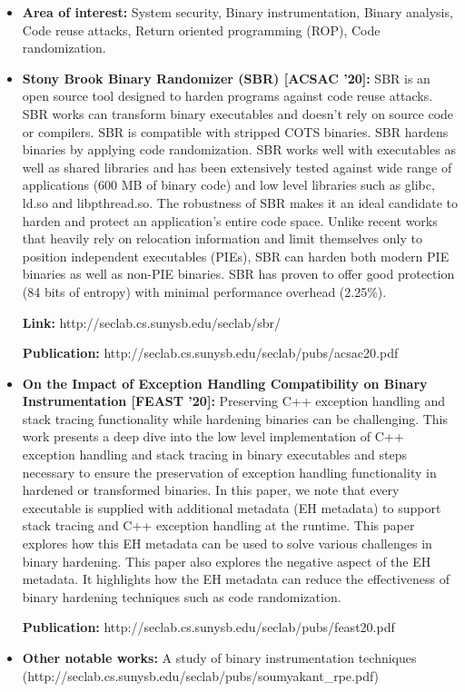 \documentclass[a4paper]{article}
\begin{document}
\begin{itemize}
\itemsep0em  
  \item \textbf{Area of interest:} System security, Binary instrumentation,
    Binary analysis, Code reuse attacks, Return oriented programming (ROP), Code
    randomization. 
  \item \textbf{Stony Brook Binary Randomizer (SBR) [ACSAC '20]:} SBR is an open
    source tool designed to harden programs against code reuse attacks. SBR
    works can transform binary executables and doesn't rely on source code or
    compilers.  SBR is compatible with stripped COTS binaries. SBR hardens
    binaries by applying code randomization. SBR works well with executables as
    well as shared libraries and has been extensively tested against wide range
    of applications (600 MB of binary code) and low level libraries such as
    glibc, ld.so and libpthread.so. The robustness of SBR makes it an ideal
    candidate to harden and protect an application's entire code space. Unlike
    recent works that heavily rely on relocation information and limit
    themselves only to position independent executables (PIEs), SBR can harden
    both modern PIE binaries as well as non-PIE binaries. SBR has proven to
    offer good protection (84 bits of entropy) with minimal performance overhead
    (2.25\%). 

    \textbf{Link:} http://seclab.cs.sunysb.edu/seclab/sbr/

    \textbf{Publication:} http://seclab.cs.sunysb.edu/seclab/pubs/acsac20.pdf

  \item \textbf{On the Impact of Exception Handling Compatibility on Binary
    Instrumentation [FEAST '20]:} Preserving C++ exception handling and stack
    tracing functionality while hardening binaries can be challenging. This work
    presents a deep dive into the low level implementation of C++ exception
    handling and stack tracing in binary executables and steps necessary to
    ensure the preservation of exception handling functionality in hardened or
    transformed binaries. In this paper, we note that every executable is
    supplied with additional metadata (EH metadata) to support stack tracing and
    C++ exception handling at the runtime. This paper explores how this EH
    metadata can be used to solve various challenges in binary hardening. This
    paper also explores the negative aspect of the EH metadata. It highlights
    how the EH metadata can reduce the effectiveness of binary hardening
    techniques such as code randomization.

    \textbf{Publication:} http://seclab.cs.sunysb.edu/seclab/pubs/feast20.pdf

  \item \textbf{Other notable works:} A study of binary instrumentation
    techniques (http://seclab.cs.sunysb.edu/seclab/pubs/soumyakant\_rpe.pdf)
\end{itemize}
\end{document}

